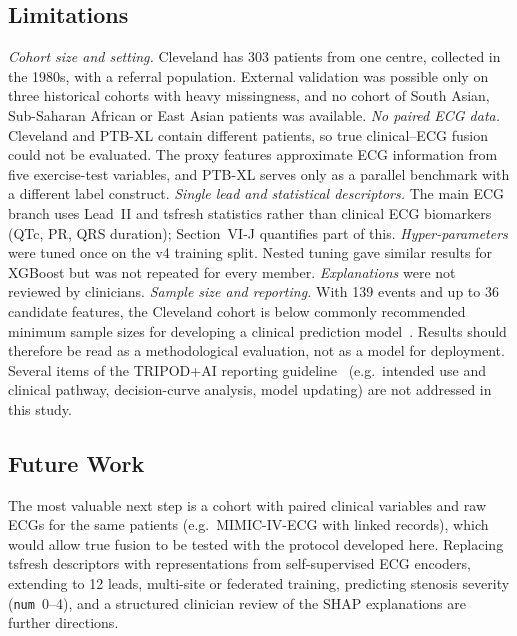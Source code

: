 \subsection{Limitations}
\emph{Cohort size and setting.} Cleveland has 303 patients from one centre, collected in the 1980s, with a referral population. External validation was possible only on three historical cohorts with heavy missingness, and no cohort of South Asian, Sub-Saharan African or East Asian patients was available.
\emph{No paired ECG data.} Cleveland and PTB-XL contain different patients, so true clinical--ECG fusion could not be evaluated. The proxy features approximate ECG information from five exercise-test variables, and PTB-XL serves only as a parallel benchmark with a different label construct.
\emph{Single lead and statistical descriptors.} The main ECG branch uses Lead~II and tsfresh statistics rather than clinical ECG biomarkers (QTc, PR, QRS duration); Section~VI-J quantifies part of this.
\emph{Hyper-parameters} were tuned once on the v4 training split. Nested tuning gave similar results for XGBoost but was not repeated for every member.
\emph{Explanations} were not reviewed by clinicians. \emph{Sample size and reporting.} With 139 events and up to 36 candidate features, the Cleveland cohort is below commonly recommended minimum sample sizes for developing a clinical prediction model~\cite{riley2020}. Results should therefore be read as a methodological evaluation, not as a model for deployment. Several items of the TRIPOD+AI reporting guideline~\cite{collins2024} (e.g.\ intended use and clinical pathway, decision-curve analysis, model updating) are not addressed in this study.

\subsection{Future Work}
The most valuable next step is a cohort with paired clinical variables and raw ECGs for the same patients (e.g.\ MIMIC-IV-ECG with linked records), which would allow true fusion to be tested with the protocol developed here. Replacing tsfresh descriptors with representations from self-supervised ECG encoders, extending to 12 leads, multi-site or federated training, predicting stenosis severity (\texttt{num}~0--4), and a structured clinician review of the SHAP explanations are further directions.
